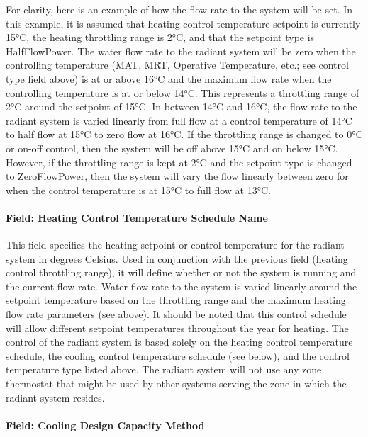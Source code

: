 For clarity, here is an example of how the flow rate to the system will be set.  In this example, it is assumed that heating control temperature setpoint is currently 15°C, the heating throttling range is 2°C, and that the setpoint type is HalfFlowPower.  The water flow rate to the radiant system will be zero when the controlling temperature (MAT, MRT, Operative Temperature, etc.; see control type field above) is at or above 16°C and the maximum flow rate when the controlling temperature is at or below 14°C. This represents a throttling range of 2°C around the setpoint of 15°C. In between 14°C and 16°C, the flow rate to the radiant system is varied linearly from full flow at a control temperature of 14°C to half flow at 15°C to zero flow at 16°C.  If the throttling range is changed to 0°C or on-off control, then the system will be off above 15°C and on below 15°C.  However, if the throttling range is kept at 2°C and the setpoint type is changed to ZeroFlowPower, then the system will vary the flow linearly between zero for when the control temperature is at 15°C to full flow at 13°C.

\paragraph{Field: Heating Control Temperature Schedule Name}\label{field-heating-control-temperature-schedule-name}

This field specifies the heating setpoint or control temperature for the radiant system in degrees Celsius. Used in conjunction with the previous field (heating control throttling range), it will define whether or not the system is running and the current flow rate. Water flow rate to the system is varied linearly around the setpoint temperature based on the throttling range and the maximum heating flow rate parameters (see above). It should be noted that this control schedule will allow different setpoint temperatures throughout the year for heating. The control of the radiant system is based solely on the heating control temperature schedule, the cooling control temperature schedule (see below), and the control temperature type listed above. The radiant system will not use any zone thermostat that might be used by other systems serving the zone in which the radiant system resides.

\paragraph{Field: Cooling Design Capacity Method}\label{field-cooling-design-capacity-method-000}

